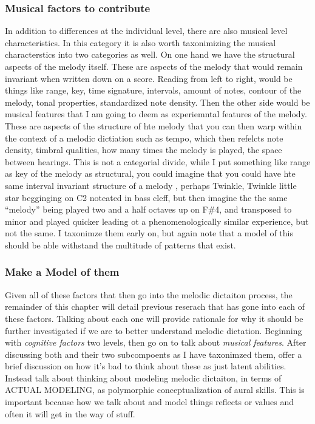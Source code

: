 \documentclass[]{book}
\theoremstyle{definition}
\theoremstyle{definition}
\theoremstyle{definition}
\theoremstyle{remark}
\begin{document}
\hypertarget{musical-factors-to-contribute}{%
\subsubsection{Musical factors to
contribute}\label{musical-factors-to-contribute}}

In addition to differences at the individual level, there are also
musical level characteristics. In this category it is also worth
taxonimizing the musical characterstics into two categories as well. On
one hand we have the structural aspects of the melody itself. These are
aspects of the melody that would remain invariant when written down on a
score. Reading from left to right, would be things like range, key, time
signature, intervals, amount of notes, contour of the melody, tonal
properties, standardized note density. Then the other side would be
musical features that I am going to deem as experiemntal features of the
melody. These are aspects of the structure of hte melody that you can
then warp within the context of a melodic dictiation such as tempo,
which then refelcts note density, timbral qualities, how many times the
melody is played, the space between hearings. This is not a categorial
divide, while I put something like range as key of the melody as
structural, you could imagine that you could have hte same interval
invariant structure of a melody , perhaps Twinkle, Twinkle little star
begginging on C2 noteated in bass cleff, but then imagine the the same
``melody'' being played two and a half octaves up on F\#4, and
transposed to minor and played quicker leading ot a phenomenologically
similar experience, but not the same. I taxonimze them early on, but
again note that a model of this should be able withstand the multitude
of patterns that exist.

\hypertarget{make-a-model-of-them}{%
\subsubsection{Make a Model of them}\label{make-a-model-of-them}}

Given all of these factors that then go into the melodic dictaiton
process, the remainder of this chapter will detail previous reserach
that has gone into each of these factors. Talking about each one will
provide rationale for why it should be further investigated if we are to
better understand melodic dictation. Beginning with \emph{cognitive
factors} two levels, then go on to talk about \emph{musical features}.
After discussing both and their two subcompoents as I have taxonimzed
them, offer a brief discussion on how it's bad to think about these as
just latent abilities. Instead talk about thinking about modeling
melodic dictaiton, in terms of ACTUAL MODELING, as polymorphic
conceptualization of aural skills. This is important because how we talk
about and model things reflects or values and often it will get in the
way of stuff.
\end{document}
